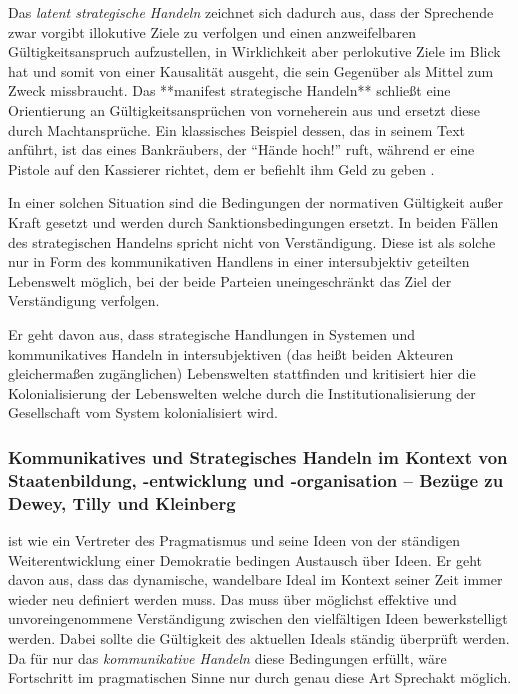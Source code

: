 Das \emph{latent strategische Handeln} zeichnet sich dadurch aus, dass der Sprechende zwar vorgibt illokutive Ziele zu verfolgen und einen anzweifelbaren Gültigkeitsanspruch aufzustellen, in Wirklichkeit aber perlokutive Ziele im Blick hat und somit von einer Kausalität ausgeht, die sein Gegenüber als Mittel zum Zweck missbraucht.
Das **manifest strategische Handeln** schließt eine Orientierung an Gültigkeitsansprüchen von vorneherein aus und ersetzt diese durch Machtansprüche. Ein klassisches Beispiel dessen, das \citeauthor{Habermas-1998-aa} in seinem Text anführt, ist das eines Bankräubers, der ``Hände hoch!'' ruft, während er eine Pistole auf den Kassierer richtet, dem er befiehlt ihm Geld zu geben \parencite[vgl.][225]{Habermas-1998-aa}.

In einer solchen Situation sind die Bedingungen der normativen Gültigkeit außer Kraft gesetzt und werden durch Sanktionsbedingungen ersetzt.
In beiden Fällen des strategischen Handelns spricht \citeauthor{Habermas-1998-aa} nicht von Verständigung.
Diese ist als solche nur in Form des kommunikativen Handlens in einer intersubjektiv geteilten Lebenswelt möglich, bei der beide Parteien uneingeschränkt das Ziel der Verständigung verfolgen.

Er geht davon aus, dass strategische Handlungen in Systemen und kommunikatives Handeln in intersubjektiven (das heißt beiden Akteuren gleichermaßen zugänglichen) Lebenswelten stattfinden und kritisiert hier die Kolonialisierung der Lebenswelten welche durch die Institutionalisierung der Gesellschaft vom System kolonialisiert wird.

\subsubsection{Kommunikatives und Strategisches Handeln im Kontext von Staatenbildung, -entwicklung und -organisation -- Bezüge zu Dewey, Tilly und Kleinberg}

\citeauthor{Dewey2010} ist wie \citeauthor{Habermas-1998-aa} ein Vertreter des Pragmatismus und seine Ideen von der ständigen Weiterentwicklung einer Demokratie bedingen Austausch über Ideen.
Er geht davon aus, dass das dynamische, wandelbare Ideal im Kontext seiner Zeit immer wieder neu definiert werden muss.
Das muss über möglichst effektive und unvoreingenommene Verständigung zwischen den vielfältigen Ideen bewerkstelligt werden.
Dabei sollte die Gültigkeit des aktuellen Ideals ständig überprüft werden.
Da für \citeauthor{Habermas-1998-aa} nur das \emph{kommunikative Handeln} diese Bedingungen erfüllt, wäre Fortschritt im pragmatischen Sinne nur durch genau diese Art Sprechakt möglich.

